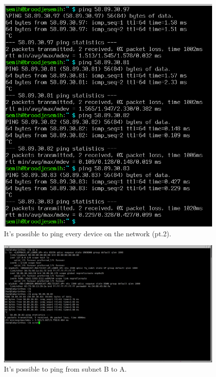 \documentclass[a4paper,1pt]{article}
\begin{document}
\begin{figure}[H]
	\centering
	\includegraphics[width=13.5cm]{bewijs2.png}
	\caption{It's possible to ping every device on the network (pt.2).}
	\label{fig:ping2}
\end{figure}

\begin{figure}[H]
	\centering
	\includegraphics[width=13.5cm]{ping.png}
	\caption{It's possible to ping from subnet B to A.}
	\label{fig:ping}
\end{figure}
\end{document}

